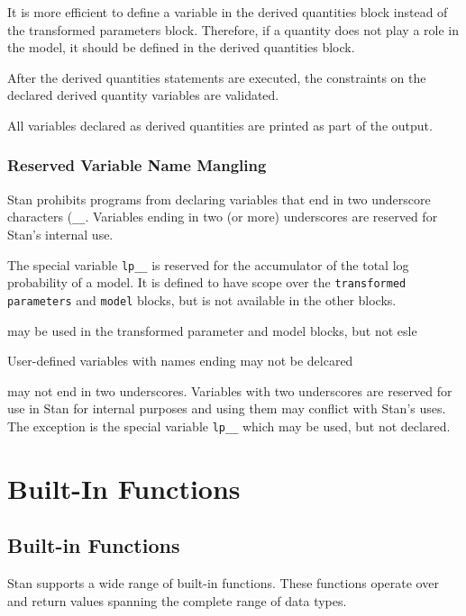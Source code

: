 \documentclass[10pt]{report}
\newcommand{\Stan}{Stan\xspace}
\newcommand{\code}[1]{{\tt #1}}
\begin{document}
It is more efficient to define a variable in the derived quantities
block instead of the transformed parameters block.  Therefore, if a
quantity does not play a role in the model, it should be defined in
the derived quantities block.  

After the derived quantities statements are executed, the constraints
on the declared derived quantity variables are validated.

All variables declared as derived quantities are printed as part of
the output. 









\section{Reserved Variable Name Mangling}

\Stan prohibits programs from declaring variables that end in two
underscore characters (\code{\_\_}.  Variables ending in two (or more)
underscores are reserved for \Stan's internal use.

The special variable \code{lp\_\_} is reserved for the accumulator of
the total log probability of a model.  It is defined to have scope
over the \code{transformed parameters} and \code{model} blocks, but is
not available in the other blocks.  

may be used in the transformed parameter and model blocks, but not
esle

User-defined variables with names ending may not be delcared

 may not end in two underscores.  Variables
with two underscores are reserved for use in \Stan for internal
purposes and using them may conflict with \Stan's uses.  The exception
is the special variable \code{lp\_\_} which may be used, but not declared.




\part{Built-In Functions}\label{built-in-functions.part}

\chapter{Built-in Functions}

\Stan supports a wide range of built-in functions.  These functions
operate over and return values spanning the complete range of data
types.  
\end{document}
